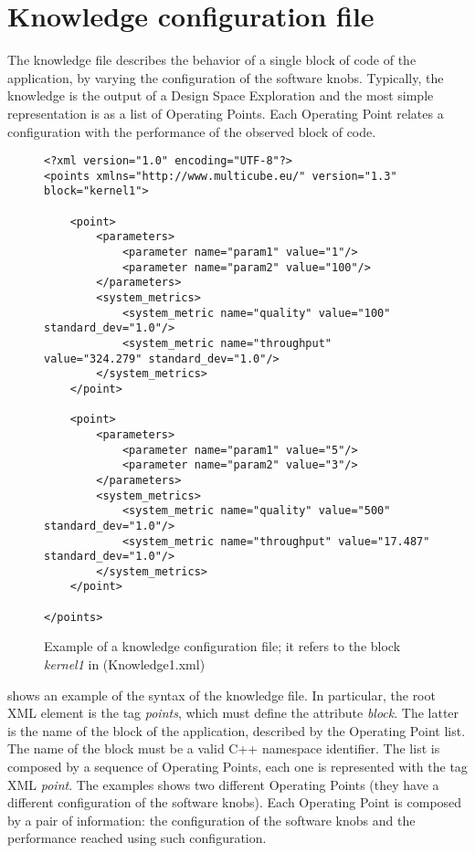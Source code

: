\section{Knowledge configuration file}
\label{sec:knowledge}

The knowledge file describes the behavior of a single block of code of the application, by varying the configuration of the software knobs. 
Typically, the knowledge is the output of a Design Space Exploration and the most simple representation is as a list of Operating Points.
Each Operating Point relates a configuration with the performance of the observed block of code.

\begin{figure}
\lstset{language=XML}
\begin{lstlisting}
<?xml version="1.0" encoding="UTF-8"?>
<points xmlns="http://www.multicube.eu/" version="1.3" block="kernel1">
	
	<point>
		<parameters>
			<parameter name="param1" value="1"/>
			<parameter name="param2" value="100"/>
		</parameters>
		<system_metrics>
			<system_metric name="quality" value="100" standard_dev="1.0"/>
			<system_metric name="throughput" value="324.279" standard_dev="1.0"/>
		</system_metrics>
	</point>
	
	<point>
		<parameters>
			<parameter name="param1" value="5"/>
			<parameter name="param2" value="3"/>
		</parameters>
		<system_metrics>
			<system_metric name="quality" value="500" standard_dev="1.0"/>
			<system_metric name="throughput" value="17.487" standard_dev="1.0"/>
		</system_metrics>
	</point>

</points>
\end{lstlisting}
\caption{Example of a knowledge configuration file; it refers to the block \textit{kernel1} in  (Knowledge1.xml)}
\label{code:knowledge_file}
\end{figure}

 shows an example of the syntax of the knowledge file.
In particular, the root XML element is the tag \textit{points}, which must define the attribute \textit{block}.
The latter is the name of the block of the application, described by the Operating Point list.
The name of the block must be a valid C++ namespace identifier.
The list is composed by a sequence of Operating Points, each one is represented with the tag XML \textit{point}.
The examples shows two different Operating Points (they have a different configuration of the software knobs).
Each Operating Point is composed by a pair of information: the configuration of the software knobs and the performance reached using such configuration.

